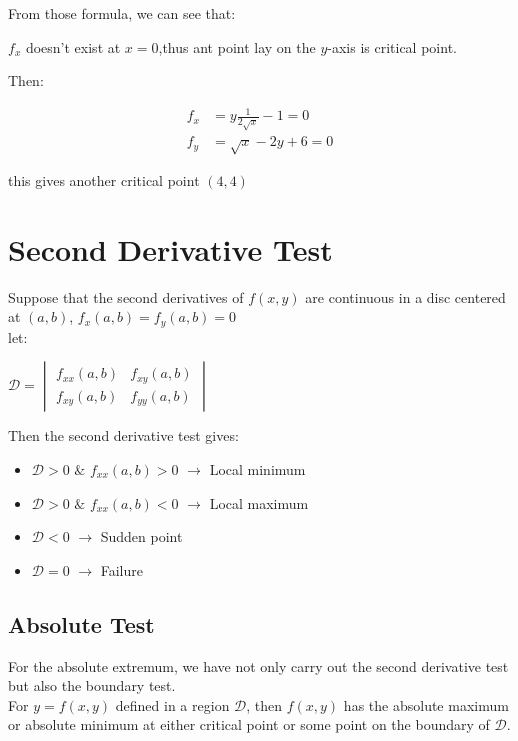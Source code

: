 From those formula, we can see that:

$f_x$ doesn't exist at $x=0$,thus ant point lay on the $y$-axis is critical point.

Then:

\begin{align*}
f_x &=y\frac{1}{2\sqrt{x}}-1=0\\
f_y &=\sqrt{x}-2y+6=0
\end{align*}

this gives another critical point $(4,4)$

\section{Second Derivative Test}
Suppose that the second derivatives of $f(x,y)$ are continuous in a disc centered at $(a,b)$, $f_x(a,b)=f_y(a,b)=0$\\

let:
\begin{center}
$\boxed{\mathcal{D}=
\begin{vmatrix}
f_{xx}(a,b) & f_{xy}(a,b)\\
f_{xy}(a,b) & f_{yy}(a,b)
\end{vmatrix}
}$
\end{center}

Then the second derivative test gives:

\begin{itemize}
\item $\mathcal{D}>0$ $\&$ $f_{xx}(a,b)>0$ $\rightarrow$ Local minimum\\
\item $\mathcal{D}>0$ $\&$ $f_{xx}(a,b)<0$ $\rightarrow$ Local maximum\\
\item $\mathcal{D}<0$ $\rightarrow$ Sudden point \\
\item $\mathcal{D}=0$ $\rightarrow$ Failure
\end{itemize}

\subsection{Absolute Test}
For the absolute extremum, we have not only carry out the second derivative test but also the boundary test.\\
For $y=f(x,y)$ defined in a region $\mathcal{D}$, then $f(x,y)$ has the absolute maximum or absolute minimum at either critical point or some point on the boundary of $\mathcal{D}$.